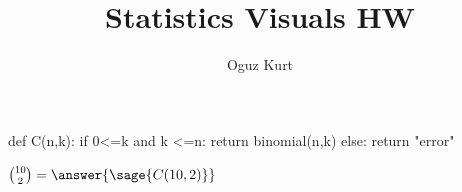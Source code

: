 \documentclass{ximera}
\title{Statistics Visuals HW}
\author{Oguz Kurt}
\begin{document}
\begin{abstract}
\empty
\end{abstract}
\maketitle

\begin{sagesilent}
def C(n,k):
    if 0<=k and k <=n:
        return binomial(n,k)
    else:
        return "error"
\end{sagesilent}
$\binom{10}{2}=\answer{\sage{C(10,2)}}$
\end{document}
